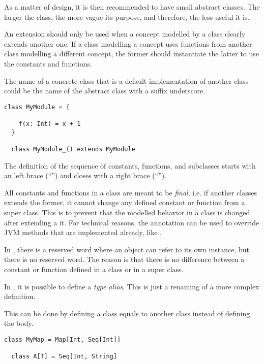 As a matter of design, it is then recommended to have small abstract classes.
The larger the class, the more vague its purpose, and therefore, the less useful it is.

An extension should only be used when a concept modelled by a class clearly extends another one.
If a class modelling a concept uses functions from another class modelling a different concept, the former should instantiate the latter to use the constants and functions.

The name of a concrete class that is a default implementation of another class could be the name of the abstract class with a suffix underscore.

\begin{lstlisting}[label={lst:exampleDefaultImplementation}]
  class MyModule = {

    f(x: Int) = x + 1
  }

  class MyModule_() extends MyModule
\end{lstlisting}

The definition of the sequence of constants, functions, and subclasses starts with an left brace (``\srccode{\{}'') and closes with a right brace (``\srccode{\}}'').

All constants and functions in a class are meant to be \textit{final}, i.e. if another classes extends the former, it cannot change any defined constant or function from a super class.
This is to prevent that the modelled behavior in a class is changed after extending a it.
For technical reasons, the annotation \sodaoverride can be used to override JVM methods that are implemented already, like .

In \Soda, there is a \sodathis reserved word where an object can refer to its own instance, but there is no \scalasuper reserved word.
The reason is that there is no difference between a constant or function defined in a class or in a super class.

In \Soda, it is possible to define a \textit{type alias}.
This is just a renaming of a more complex definition.

This can be done by defining a class equals to another class instead of defining the body.

\begin{lstlisting}[label={lst:exampleTypeAlias}]
  class MyMap = Map[Int, Seq[Int]]

  class A[T] = Seq[Int, String]
\end{lstlisting}

